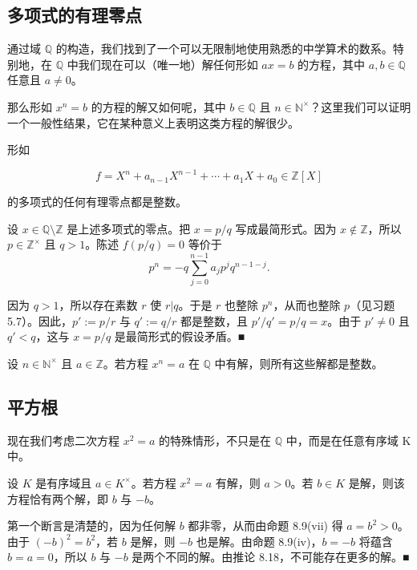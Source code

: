 \subsection*{多项式的有理零点}

通过域 $ \mathbb{Q} $ 的构造，我们找到了一个可以无限制地使用熟悉的中学算术的数系。特别地，在 $ \mathbb{Q} $ 中我们现在可以（唯一地）解任何形如 $ ax = b $ 的方程，其中 $ a, b \in \mathbb{Q} $ 任意且 $ a \neq 0 $。

那么形如 $ x^n = b $ 的方程的解又如何呢，其中 $ b \in \mathbb{Q} $ 且 $ n \in \mathbb{N}^\times $？这里我们可以证明一个一般性结果，它在某种意义上表明这类方程的解很少。

\begin{proposition}

形如

\[
f=X^{n}+a_{n-1}X^{n-1}+\cdots+a_{1}X+a_{0}\in\mathbb{Z}[X]
\]

的多项式的任何有理零点都是整数。

\proofhead
设 $ x \in \mathbb{Q} \setminus \mathbb{Z} $ 是上述多项式的零点。把 $ x = p/q $ 写成最简形式。因为 $ x \notin \mathbb{Z} $，所以 $ p \in \mathbb{Z}^\times $ 且 $ q > 1 $。陈述 $ f(p/q) = 0 $ 等价于
\[
p^{n}=-q\sum_{j=0}^{n-1}a_{j} p^{j} q^{n-1-j}.
\]

因为 $q>1$，所以存在素数 $r$ 使 $r|q$。于是 $r$ 也整除 $p^n$，从而也整除 $p$（见习题 5.7）。因此，$p':=p/r$ 与 $q':=q/r$ 都是整数，且 $p'/q'=p/q=x$。由于 $p' \neq 0$ 且 $q'<q$，这与 $x=p/q$ 是最简形式的假设矛盾。■

\end{proposition}

\begin{corollary}

设 $ n \in \mathbb{N}^\times $ 且 $ a \in \mathbb{Z} $。若方程 $ x^n = a $ 在 $ \mathbb{Q} $ 中有解，则所有这些解都是整数。

\end{corollary}

\subsection*{平方根}

现在我们考虑二次方程 $ x^2 = a $ 的特殊情形，不只是在 $ \mathbb{Q} $ 中，而是在任意有序域 K 中。

\begin{lemma}

设 $K$ 是有序域且 $a \in K^\times$。若方程 $x^2 = a$ 有解，则 $a > 0$。若 $b \in K$ 是解，则该方程恰有两个解，即 $b$ 与 $-b$。

\proofhead
第一个断言是清楚的，因为任何解 $b$ 都非零，从而由命题 8.9(vii) 得 $a = b^2 > 0$。由于 $(-b)^2 = b^2$，若 $b$ 是解，则 $-b$ 也是解。由命题 8.9(iv)，$b = -b$ 将蕴含 $b = a = 0$，所以 $b$ 与 $-b$ 是两个不同的解。由推论 8.18，不可能存在更多的解。■
\end{lemma}

